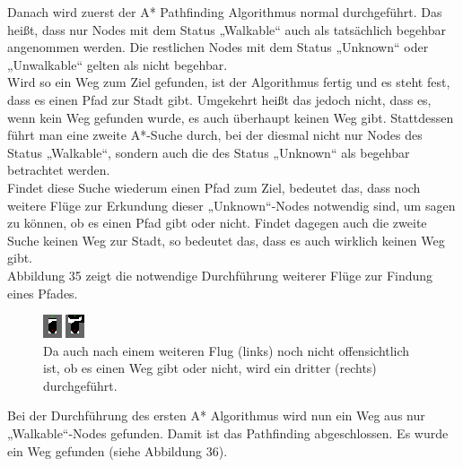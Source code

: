 \documentclass[a4paper,12pt]{article}
\begin{document}
Danach wird zuerst der A* Pathfinding Algorithmus normal durchgeführt. Das heißt, dass nur Nodes mit dem Status „Walkable“ auch als tatsächlich begehbar angenommen werden. Die restlichen Nodes mit dem Status „Unknown“ oder „Unwalkable“ gelten als nicht begehbar.
\\[0.4cm]
Wird so ein Weg zum Ziel gefunden, ist der Algorithmus fertig und es steht fest, dass es einen Pfad zur Stadt gibt. Umgekehrt heißt das jedoch nicht, dass es, wenn kein Weg gefunden wurde, es auch überhaupt keinen Weg gibt. Stattdessen führt man eine zweite A*-Suche durch, bei der diesmal nicht nur Nodes des Status „Walkable“, sondern auch die des Status „Unknown“ als begehbar betrachtet werden.
\\[0.4cm]
Findet diese Suche wiederum einen Pfad zum Ziel, bedeutet das, dass noch weitere Flüge zur Erkundung dieser „Unknown“-Nodes notwendig sind, um sagen zu können, ob es einen Pfad gibt oder nicht.
Findet dagegen auch die zweite Suche keinen Weg zur Stadt, so bedeutet das, dass es auch wirklich keinen Weg gibt.
\\[0.4cm]
Abbildung 35 zeigt die notwendige Durchführung weiterer Flüge zur Findung eines Pfades.
\begin{figure}[H]
\centering
    \includegraphics[width=1\linewidth]{Bilder/Aufgabe3/Teilaufgabe_A/Beispiel_03.png}
    \caption{Da auch nach einem weiteren Flug (links) noch nicht offensichtlich ist, ob es einen Weg gibt oder nicht, wird ein dritter (rechts) durchgeführt.}
\end{figure}
Bei der Durchführung des ersten A* Algorithmus wird nun ein Weg aus nur „Walkable“-Nodes gefunden. Damit ist das Pathfinding abgeschlossen. Es wurde ein Weg gefunden (siehe Abbildung 36).
\end{document}
